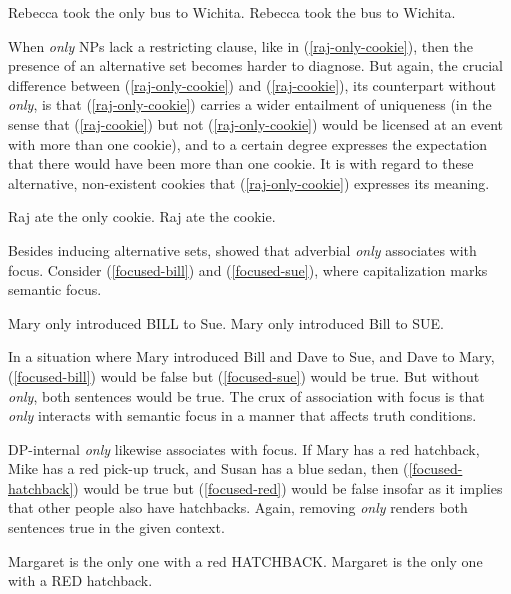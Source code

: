 \begin{exe}
	\ex \label{rebecca-only-bus} Rebecca took the only bus to Wichita.
	\ex \label{rebecca-bus} Rebecca took the bus to Wichita.
\end{exe}

When \textit{only} NPs lack a restricting clause, like in (\ref{raj-only-cookie}), then the presence of an alternative set becomes harder to diagnose. But again, the crucial difference between (\ref{raj-only-cookie}) and (\ref{raj-cookie}), its counterpart without \textit{only}, is that (\ref{raj-only-cookie}) carries a wider entailment of uniqueness (in the sense that (\ref{raj-cookie}) but not (\ref{raj-only-cookie}) would be licensed at an event with more than one cookie), and to a certain degree expresses the expectation that there would have been more than one cookie. It is with regard to these alternative, non-existent cookies that (\ref{raj-only-cookie}) expresses its meaning.

\begin{exe}
	\ex \label{raj-only-cookie} Raj ate the only cookie.
	\ex \label{raj-cookie} Raj ate the cookie.
\end{exe}

Besides inducing alternative sets, \citet{rooth85} showed that adverbial \textit{only} associates with focus. Consider (\ref{focused-bill}) and (\ref{focused-sue}), where capitalization marks semantic focus.

\begin{exe}
	\ex \label{focused-bill} Mary only introduced BILL to Sue.
	\ex \label{focused-sue} Mary only introduced Bill to SUE.
\end{exe}

In a situation where Mary introduced Bill and Dave to Sue, and Dave to Mary, (\ref{focused-bill}) would be false but (\ref{focused-sue}) would be true. But without \textit{only}, both sentences would be true. The crux of association with focus is that \textit{only} interacts with semantic focus in a manner that affects truth conditions.

DP-internal \textit{only} likewise associates with focus. If Mary has a red hatchback, Mike has a red pick-up truck, and Susan has a blue sedan, then (\ref{focused-hatchback}) would be true but (\ref{focused-red}) would be false insofar as it implies that other people also have hatchbacks. Again, removing \textit{only} renders both sentences true in the given context.

\begin{exe}
	\ex \label{focused-hatchback} Margaret is the only one with a red HATCHBACK.
	\ex \label{focused-red} Margaret is the only one with a RED hatchback.
\end{exe}

